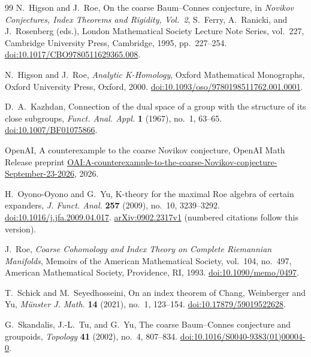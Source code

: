\begin{thebibliography}{99}
N.~Higson and J.~Roe,
On the coarse Baum--Connes conjecture,
in \emph{Novikov Conjectures, Index Theorems and Rigidity, Vol.~2},
S.~Ferry, A.~Ranicki, and J.~Rosenberg (eds.),
London Mathematical Society Lecture Note Series, vol.~227,
Cambridge University Press, Cambridge, 1995, pp.~227--254.
\href{https://doi.org/10.1017/CBO9780511629365.008}{doi:10.1017/CBO9780511629365.008}.

N.~Higson and J.~Roe,
\emph{Analytic K-Homology},
Oxford Mathematical Monographs,
Oxford University Press, Oxford, 2000.
\href{https://doi.org/10.1093/oso/9780198511762.001.0001}{doi:10.1093/oso/9780198511762.001.0001}.

D.~A.~Kazhdan,
Connection of the dual space of a group with the structure of its close subgroups,
\emph{Funct. Anal. Appl.} \textbf{1} (1967), no.~1, 63--65.
\href{https://doi.org/10.1007/BF01075866}{doi:10.1007/BF01075866}.

OpenAI,
A counterexample to the coarse Novikov conjecture,
OpenAI Math Release preprint
\href{https://github.com/openai/math/blob/main/preprints/A-counterexample-to-the-coarse-Novikov-conjecture-September-23-2026/paper.pdf}{OAI:A-counterexample-to-the-coarse-Novikov-conjecture-September-23-2026},
2026.

H.~Oyono-Oyono and G.~Yu,
K-theory for the maximal Roe algebra of certain expanders,
\emph{J. Funct. Anal.} \textbf{257} (2009), no.~10, 3239--3292.
\href{https://doi.org/10.1016/j.jfa.2009.04.017}{doi:10.1016/j.jfa.2009.04.017}.
\href{https://arxiv.org/abs/0902.2317v1}{arXiv:0902.2317v1}
(numbered citations follow this version).

J.~Roe,
\emph{Coarse Cohomology and Index Theory on Complete Riemannian Manifolds},
Memoirs of the American Mathematical Society, vol.~104, no.~497,
American Mathematical Society, Providence, RI, 1993.
\href{https://doi.org/10.1090/memo/0497}{doi:10.1090/memo/0497}.

T.~Schick and M.~Seyedhosseini,
On an index theorem of Chang, Weinberger and Yu,
\emph{M\"unster J. Math.} \textbf{14} (2021), no.~1, 123--154.
\href{https://doi.org/10.17879/59019522628}{doi:10.17879/59019522628}.

G.~Skandalis, J.-L.~Tu, and G.~Yu,
The coarse Baum--Connes conjecture and groupoids,
\emph{Topology} \textbf{41} (2002), no.~4, 807--834.
\href{https://doi.org/10.1016/S0040-9383(01)00004-0}{doi:10.1016/S0040-9383(01)00004-0}.


\end{thebibliography}
